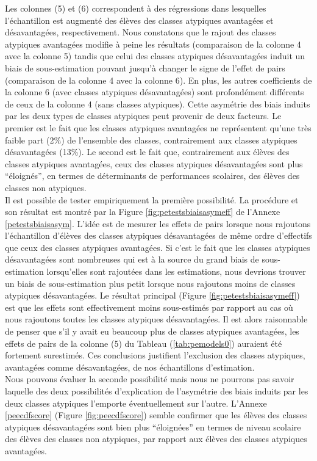 \documentclass[
]{book}
\begin{document}
\quad Les colonnes (5) et (6) correspondent à des régressions dans lesquelles l'échantillon est augmenté des élèves des classes atypiques avantagées et désavantagées, respectivement. Nous constatons que le rajout des classes atypiques avantagées modifie à peine les résultats (comparaison de la colonne 4 avec la colonne 5) tandis que celui des classes atypiques désavantagées induit un biais de sous-estimation pouvant jusqu'à changer le signe de l'effet de pairs (comparaison de la colonne 4 avec la colonne 6). En plus, les autres coefficients de la colonne 6 (avec classes atypiques désavantagées) sont profondément différents de ceux de la colonne 4 (sans classes atypiques). Cette asymétrie des biais induits par les deux types de classes atypiques peut provenir de deux facteurs. Le premier est le fait que les classes atypiques avantagées ne représentent qu'une très faible part (2\%) de l'ensemble des classes, contrairement aux classes atypiques désavantagées (13\%). Le second est le fait que, contrairement aux élèves des classes atypiques avantagées, ceux des classes atypiques désavantagées sont plus ``éloignés'', en termes de déterminants de performances scolaires, des élèves des classes non atypiques.\\
Il est possible de tester empiriquement la première possibilité. La procédure et son résultat est montré par la Figure \ref{fig:petestsbiaisasymeff} de l'Annexe \ref{petestsbiaisasym}. L'idée est de mesurer les effets de pairs lorsque nous rajoutons l'échantillon d'élèves des classes atypiques désavantagées de même ordre d'effectifs que ceux des classes atypiques avantagées. Si c'est le fait que les classes atypiques désavantagées sont nombreuses qui est à la source du grand biais de sous-estimation lorsqu'elles sont rajoutées dans les estimations, nous devrions trouver un biais de sous-estimation plus petit lorsque nous rajoutons moins de classes atypiques désavantagées. Le résultat principal (Figure \ref{fig:petestsbiaisasymeff}) est que les effets sont effectivement moins sous-estimés par rapport au cas où nous rajoutons toutes les classes atypiques désavantagées. Il est alors raisonnable de penser que s'il y avait eu beaucoup plus de classes atypiques avantagées, les effets de pairs de la colonne (5) du Tableau (\ref{tab:pemodels0}) auraient été fortement surestimés. Ces conclusions justifient l'exclusion des classes atypiques, avantagées comme désavantagées, de nos échantillons d'estimation.\\
Nous pouvons évaluer la seconde possibilité mais nous ne pourrons pas savoir laquelle des deux possibilités d'explication de l'asymétrie des biais induits par les deux classes atypiques l'emporte éventuellement sur l'autre. L'Annexe \ref{peecdfscore} (Figure \ref{fig:peecdfscore}) semble confirmer que les élèves des classes atypiques désavantagées sont bien plus ``éloignées'' en termes de niveau scolaire des élèves des classes non atypiques, par rapport aux élèves des classes atypiques avantagées.
\end{document}
